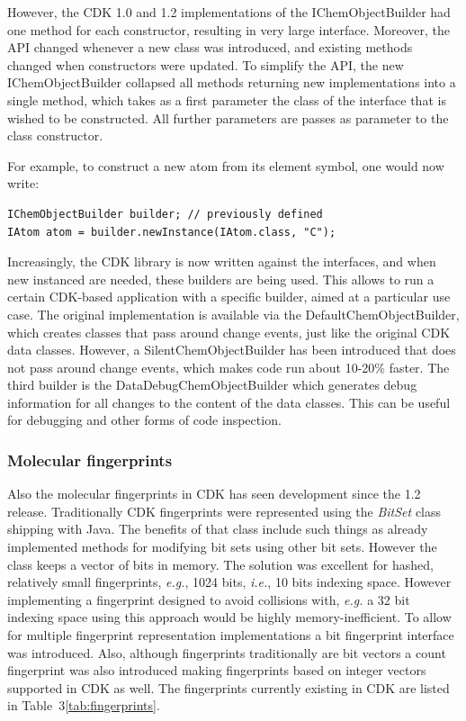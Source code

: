 \documentclass[10pt]{bmcart}
\begin{document}
However, the CDK 1.0 and 1.2 implementations of the IChemObjectBuilder had one method for
each constructor, resulting in very large interface. Moreover, the API changed whenever
a new class was introduced, and existing methods changed when constructors were updated.
To simplify the API, the new IChemObjectBuilder collapsed all methods returning new
implementations into a single method, which takes as a first parameter the class of the
interface that is wished to be constructed. All further parameters are passes as
parameter to the class constructor.

For example, to construct a new atom from its element symbol, one would now write:

\begin{verbatim}
IChemObjectBuilder builder; // previously defined
IAtom atom = builder.newInstance(IAtom.class, "C");
\end{verbatim}

Increasingly, the CDK library is now written against the interfaces, and when new instanced
are needed, these builders are being used. This allows to run a certain CDK-based
application with a specific builder, aimed at a particular use case. The original
implementation is available via the DefaultChemObjectBuilder, which creates
classes that pass around change events, just like the original CDK data classes.
However, a SilentChemObjectBuilder has been introduced that does not pass around
change events, which makes code run about 10-20\% faster.
The third builder is the DataDebugChemObjectBuilder which generates debug information
for all changes to the content of the data classes. This can be useful for
debugging and other forms of code inspection.

\subsubsection*{Molecular fingerprints}
Also the molecular fingerprints in CDK has seen development since the 1.2
release. Traditionally CDK fingerprints were represented using the
\textit{BitSet} class shipping with Java. The benefits of that class include
such things as already implemented methods for modifying bit sets using other
bit sets. However the class keeps a vector of bits in memory. The solution was
excellent for hashed, relatively small fingerprints, \textit{e.g.}, 1024 bits,
\textit{i.e.}, 10 bits indexing space. However implementing a fingerprint
designed to avoid collisions with, \textit{e.g.} a 32 bit indexing space using
this approach would be highly memory-inefficient. To allow for multiple
fingerprint representation implementations a bit fingerprint interface was
introduced. Also, although fingerprints traditionally are bit vectors a count
fingerprint was also introduced making fingerprints based on integer vectors
supported in CDK as well. The fingerprints currently existing in CDK are listed
in Table~3\ref{tab:fingerprints}.
\end{document}
